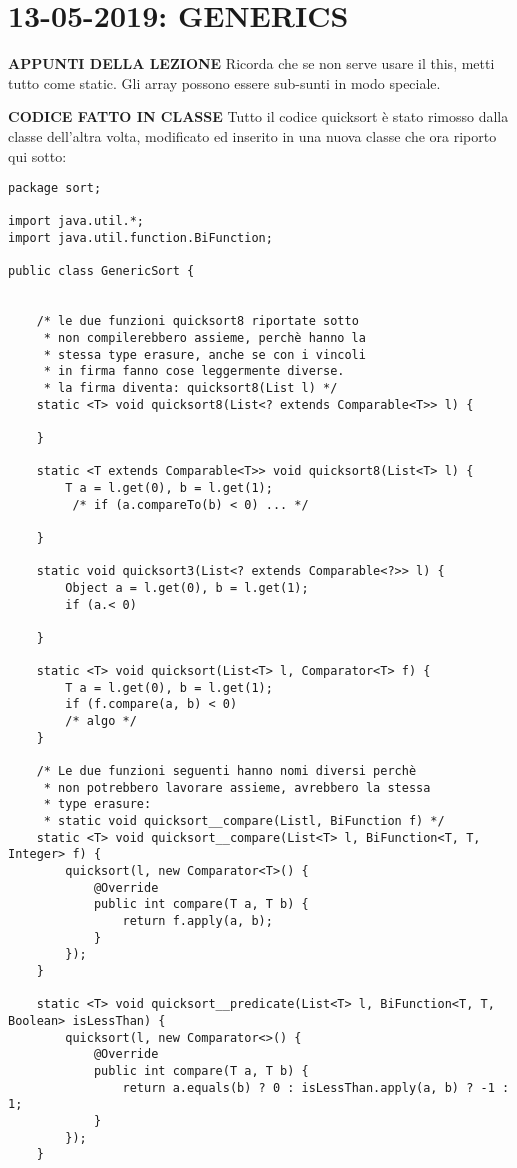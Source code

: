 

\newpage
\section{13-05-2019: GENERICS}
\noindent \textbf{APPUNTI DELLA LEZIONE} \newline
Ricorda che se non serve usare il this, metti tutto come static. \newline
Gli array possono essere sub-sunti in modo speciale.


\noindent \textbf{CODICE FATTO IN CLASSE} \newline
Tutto il codice quicksort è stato rimosso dalla classe dell'altra volta, modificato ed inserito in una nuova classe che ora riporto qui sotto:
\begin{lstlisting}
package sort;

import java.util.*;
import java.util.function.BiFunction;

public class GenericSort {


	/* le due funzioni quicksort8 riportate sotto
	 * non compilerebbero assieme, perchè hanno la 
	 * stessa type erasure, anche se con i vincoli
	 * in firma fanno cose leggermente diverse.
	 * la firma diventa: quicksort8(List l) */
    static <T> void quicksort8(List<? extends Comparable<T>> l) {

    }

    static <T extends Comparable<T>> void quicksort8(List<T> l) {
        T a = l.get(0), b = l.get(1);
         /* if (a.compareTo(b) < 0) ... */

    }

    static void quicksort3(List<? extends Comparable<?>> l) {
        Object a = l.get(0), b = l.get(1);
        if (a.< 0)

    }

    static <T> void quicksort(List<T> l, Comparator<T> f) {
        T a = l.get(0), b = l.get(1);
        if (f.compare(a, b) < 0)
        /* algo */
    }

	/* Le due funzioni seguenti hanno nomi diversi perchè
	 * non potrebbero lavorare assieme, avrebbero la stessa
	 * type erasure:
	 * static void quicksort__compare(Listl, BiFunction f) */
    static <T> void quicksort__compare(List<T> l, BiFunction<T, T, Integer> f) { 
        quicksort(l, new Comparator<T>() {
            @Override
            public int compare(T a, T b) {
                return f.apply(a, b);
            }
        });
    }

    static <T> void quicksort__predicate(List<T> l, BiFunction<T, T, Boolean> isLessThan) {
        quicksort(l, new Comparator<>() {
            @Override
            public int compare(T a, T b) {
                return a.equals(b) ? 0 : isLessThan.apply(a, b) ? -1 : 1;
            }
        });
    }


\end{lstlisting}
